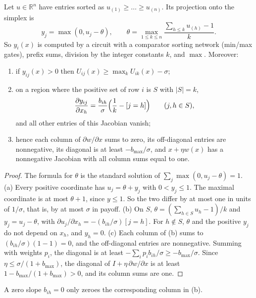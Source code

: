 \begin{lemma}\label{lem:ueopl-proj}
Let $u\in\mathbb R^n$ have entries sorted as $u_{(1)}\ge\dots\ge u_{(n)}$. Its projection onto the
simplex is
\[
  y_j=\max(0,u_j-\theta),\qquad \theta=\max_{1\le k\le n}\frac{\sum_{h\le k}u_{(h)}-1}{k}.
\]
So $y_i(x)$ is computed by a circuit with a comparator sorting network (min/max gates), prefix sums,
division by the integer constants $k$, and $\max$. Moreover:
\begin{enumerate}[label=(\alph*),nosep]
  \item if $y_{ij}(x)>0$ then $U_{ij}(x)\ge\max_kU_{ik}(x)-\sigma$;
  \item on a region where the positive set of row $i$ is $S$ with $|S|=k$,
        \[
          \frac{\partial y_{ij}}{\partial x_h}=\frac{b_{ih}}{\sigma}\Bigl(\frac1k-[j=h]\Bigr)\qquad(j,h\in S),
        \]
        and all other entries of this Jacobian vanish;
  \item hence each column of $\partial w/\partial x$ sums to zero, its off-diagonal entries are
        nonnegative, its diagonal is at least $-b_{\max}/\sigma$, and $x+\eta w(x)$ has a nonnegative
        Jacobian with all column sums equal to one.
\end{enumerate}
\end{lemma}

\begin{proof}
The formula for $\theta$ is the standard solution of $\sum_j\max(0,u_j-\theta)=1$. (a) Every positive
coordinate has $u_j=\theta+y_j$ with $0<y_j\le1$. The maximal coordinate is at most $\theta+1$, since
$y\le 1$. So the two differ by at most one in units of $1/\sigma$, that is, by at most $\sigma$ in
payoff. (b) On $S$, $\theta=(\sum_{h\in S}u_h-1)/k$ and $y_j=u_j-\theta$, with
$\partial u_j/\partial x_h=-(b_{ih}/\sigma)[j=h]$. For $h\notin S$, $\theta$ and the positive $y_j$ do
not depend on $x_h$, and $y_h=0$. (c) Each column of (b) sums to $(b_{ih}/\sigma)(1-1)=0$, and the
off-diagonal entries are nonnegative. Summing with weights $p_i$, the diagonal is at least
$-\sum_ip_ib_{ih}/\sigma\ge-b_{\max}/\sigma$. Since $\eta\le\sigma/(1+b_{\max})$, the diagonal of
$I+\eta\,\partial w/\partial x$ is at least $1-b_{\max}/(1+b_{\max})>0$, and its column sums are one.
\end{proof}

A zero slope $b_{ih}=0$ only zeroes the corresponding column in (b).

